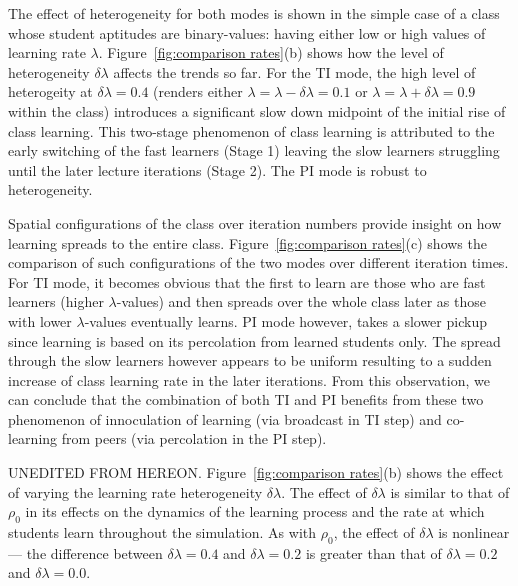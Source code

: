 \documentclass[twocolumn,secnumarabic,amssymb, nobibnotes, aps, prd]{revtex4-2}
\begin{document}
        The effect of heterogeneity for both modes is shown in the simple case of a class whose student aptitudes are binary-values: having either low or high values of learning rate $\lambda$.
        Figure~\ref{fig:comparison rates}(b) shows how the level of heterogeneity $\delta\!\lambda$ affects the trends so far.
        For the TI mode, the high level of heterogeity at $\delta\!\lambda=0.4$ (renders either $\lambda=\lambda-\delta\!\lambda=0.1$ or $\lambda=\lambda+\delta\!\lambda=0.9$ within the class) introduces a significant slow down midpoint of the initial rise of class learning.
        This two-stage phenomenon of class learning is attributed to the early switching of the fast learners (Stage 1) leaving the slow learners struggling until the later lecture iterations (Stage 2).
        The PI mode is robust to heterogeneity.
        
        Spatial configurations of the class over iteration numbers provide insight on how learning spreads to the entire class.
        Figure~\ref{fig:comparison rates}(c) shows the comparison of such configurations of the two modes over different iteration times.
        For TI mode, it becomes obvious that the first to learn are those who are fast learners (higher $\lambda$-values) and then spreads over the whole class later as those with lower $\lambda$-values eventually learns.
        PI mode however, takes a slower pickup since learning is based on its percolation from learned students only.
        The spread through the slow learners however appears to be uniform resulting to a sudden increase of class learning rate in the later iterations.
        From this observation, we can conclude that the combination of both TI and PI benefits from these two phenomenon of innoculation of learning (via broadcast in TI step) and co-learning from peers (via percolation in the PI step).

        {\color{red} UNEDITED FROM HEREON.}
        Figure~\ref{fig:comparison rates}(b) shows the effect of varying the learning rate heterogeneity $\delta\lambda$.
        The effect of $\delta\lambda$ is similar to that of $\rho_0$ in its effects on the dynamics of the learning process and the rate at which students learn throughout the simulation.
        As with $\rho_0$, the effect of $\delta\lambda$ is nonlinear --- the difference between $\delta\lambda=0.4$ and $\delta\lambda=0.2$ is greater than that of $\delta\lambda=0.2$ and $\delta\lambda=0.0$.


        
\end{document}
